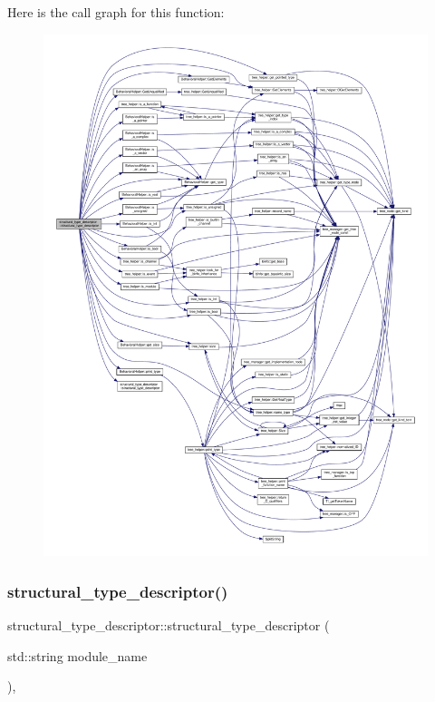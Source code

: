 Here is the call graph for this function\+:
\nopagebreak
\begin{figure}[H]
\begin{center}
\leavevmode
\includegraphics[width=350pt]{dc/da4/structstructural__type__descriptor_a337b14675e37bcfe28a67adb43eff4fa_cgraph}
\end{center}
\end{figure}
\mbox{\label{structstructural__type__descriptor_a9e965d998e698f23d74613c28725682a}} 
\subsubsection{\texorpdfstring{structural\+\_\+type\+\_\+descriptor()}{structural\_type\_descriptor()}\hspace{0.1cm}{\footnotesize\ttfamily [3/3]}}
{\footnotesize\ttfamily structural\+\_\+type\+\_\+descriptor\+::structural\+\_\+type\+\_\+descriptor (\begin{DoxyParamCaption}\item[{std\+::string}]{module\+\_\+name }\end{DoxyParamCaption})\hspace{0.3cm}{\ttfamily [inline]}, {\ttfamily [explicit]}}



